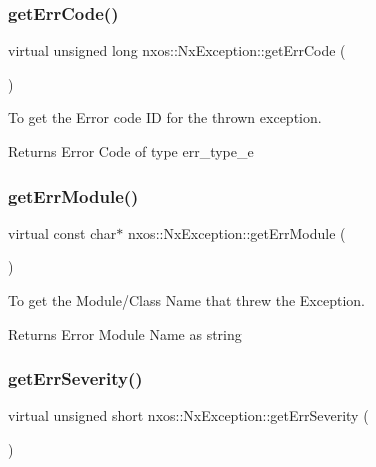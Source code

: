 \subsubsection{\texorpdfstring{get\+Err\+Code()}{getErrCode()}}
{\footnotesize\ttfamily virtual unsigned long nxos\+::\+Nx\+Exception\+::get\+Err\+Code (\begin{DoxyParamCaption}{ }\end{DoxyParamCaption})\hspace{0.3cm}{\ttfamily [pure virtual]}}

To get the Error code ID for the thrown exception.

\begin{DoxyReturn}{Returns}
Error Code of type err\+\_\+type\+\_\+e 
\end{DoxyReturn}
\mbox{\label{classnxos_1_1_nx_exception_ad428a765217581f320af95386350ef30}} 
\subsubsection{\texorpdfstring{get\+Err\+Module()}{getErrModule()}}
{\footnotesize\ttfamily virtual const char$\ast$ nxos\+::\+Nx\+Exception\+::get\+Err\+Module (\begin{DoxyParamCaption}{ }\end{DoxyParamCaption})\hspace{0.3cm}{\ttfamily [pure virtual]}}

To get the Module/\+Class Name that threw the Exception.

\begin{DoxyReturn}{Returns}
Error Module Name as string 
\end{DoxyReturn}
\mbox{\label{classnxos_1_1_nx_exception_a7b5ffd11c04e3955d874ea7a6b18063f}} 
\subsubsection{\texorpdfstring{get\+Err\+Severity()}{getErrSeverity()}}
{\footnotesize\ttfamily virtual unsigned short nxos\+::\+Nx\+Exception\+::get\+Err\+Severity (\begin{DoxyParamCaption}{ }\end{DoxyParamCaption})\hspace{0.3cm}{\ttfamily [pure virtual]}}

